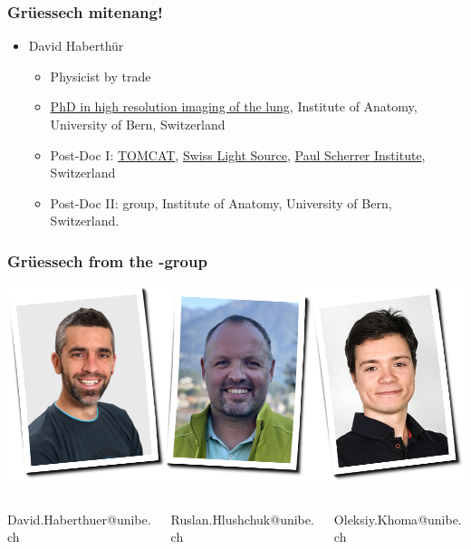 \begin{frame}
	\frametitle{Grüessech mitenang!}
	\begin{itemize}
		\item David Haberthür
		\begin{itemize}
			\item Physicist by trade
			\item \href{https://boris.unibe.ch/2619/}{PhD in high resolution imaging of the lung}, Institute of Anatomy, University of Bern, Switzerland
			\item Post-Doc I: \href{https://www.psi.ch/sls/tomcat/}{TOMCAT}, \href{https://www.psi.ch/sls/}{Swiss Light Source}, \href{https://www.psi.ch/}{Paul Scherrer Institute}, Switzerland
			\item Post-Doc II: \uct{} group, Institute of Anatomy, University of Bern, Switzerland.
		\end{itemize}
	\end{itemize}
\end{frame}

\begin{frame}
	\frametitle{Grüessech from the \uct-group}
	\centering
	\includegraphics[height=\imageheight]{./images/team}
		\begin{columns}
		\hfill\begin{column}{0.33\textwidth}
			\centering%
			David{\color{ubRed!61.8}.}Haberthuer{\color{ubRed!61.8}@unibe.ch}%
		\end{column}
		\begin{column}{0.33\textwidth}
			\centering%
			Ruslan{\color{ubRed!61.8}.}Hlushchuk{\color{ubRed!61.8}@unibe.ch}%
		\end{column}
		\begin{column}{0.33\textwidth}
			\centering%
			Oleksiy{\color{ubRed!61.8}.}Khoma{\color{ubRed!61.8}@unibe.ch}%
		\end{column}\hfill%
	\end{columns}
\end{frame}

